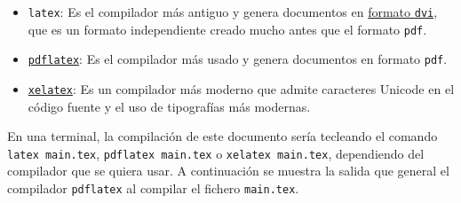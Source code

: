 \documentclass[
  a4paper,
]{scrreport}
\providecommand{\tightlist}{%
  \setlength{\itemsep}{0pt}\setlength{\parskip}{0pt}}\usepackage{longtable,booktabs,array}
\theoremstyle{definition}
\theoremstyle{remark}
\begin{document}
\begin{itemize}
\tightlist
\item
  \texttt{latex}: Es el compilador más antiguo y genera documentos en
  \href{https://es.wikipedia.org/wiki/DVI_(TeX)}{formato \texttt{dvi}},
  que es un formato independiente creado mucho antes que el formato
  \texttt{pdf}.
\item
  \href{https://www.tug.org/applications/pdftex/}{\texttt{pdflatex}}: Es
  el compilador más usado y genera documentos en formato \texttt{pdf}.
\item
  \href{https://tug.org/xetex/}{\texttt{xelatex}}: Es un compilador más
  moderno que admite caracteres Unicode en el código fuente y el uso de
  tipografías más modernas.
\end{itemize}

En una terminal, la compilación de este documento sería tecleando el
comando \texttt{latex\ main.tex}, \texttt{pdflatex\ main.tex} o
\texttt{xelatex\ main.tex}, dependiendo del compilador que se quiera
usar. A continuación se muestra la salida que general el compilador
\texttt{pdflatex} al compilar el fichero \texttt{main.tex}.
\end{document}

